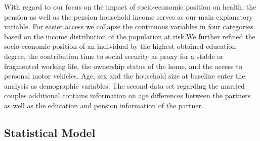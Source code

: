 \documentclass[a4paper,10pt,oneside,english]{article}
\begin{document}
With regard to our focus on the impact of socio-economic position on health, the pension as well as the pension household income serves as our main explanatory variable. For easier access we collapse the continuous variables in four categories based on the income distribution of the population at risk.We further refined the socio-economic position of an individual by the highest obtained education degree, the contribution time to social security as proxy for a stable or fragmented working life, the ownership status of the home, and the access to personal motor vehicles. Age, sex and the household size at baseline enter the analysis as demographic variables. The second data set regarding the married couples additional contains information on age differences between the partners as well as the education and pension information of the partner. 

\subsection*{\textsf{Statistical Model}}
\end{document}
